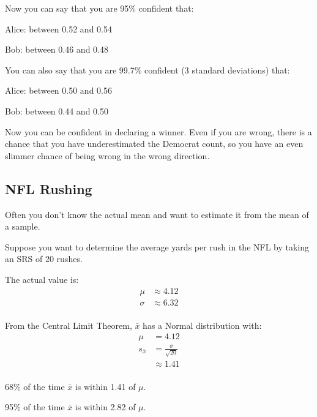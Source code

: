 \documentclass[landscape]{exam}
\begin{document}
  Now you can say that you are 95\% confident that:
  \begin{itemize*}
    \item Alice: between 0.52 and 0.54
    \item Bob: between 0.46 and 0.48
  \end{itemize*}

  You can also say that you are 99.7\% confident (3 standard deviations) that:
  \begin{itemize*}
    \item Alice: between 0.50 and 0.56
    \item Bob: between 0.44 and 0.50
  \end{itemize*}

  Now you can be confident in declaring a winner. Even if you are wrong, there
  is a chance that you have underestimated the Democrat count, so you have an
  even slimmer chance of being wrong in the wrong direction.

  \subsection{NFL Rushing}
  Often you don't know the actual mean and want to estimate it from the mean of
  a sample.

  Suppose you want to determine the average yards per rush in the NFL by taking
  an SRS of 20 rushes.

  The actual value is:
  \begin{align*}
    \mu    & \approx 4.12 \\
    \sigma & \approx 6.32 \\
  \end{align*}

  From the Central Limit Theorem, $\bar{x}$ has a Normal distribution with:
  \begin{align*}
    \mu         & = 4.12 \\
    s_{\bar{x}} & = \frac{\sigma}{\sqrt{20}} \\
                & \approx 1.41 \\
  \end{align*}

  \begin{itemize*}
    \item 68\% of the time $\bar{x}$ is within 1.41 of $\mu$.
    \item 95\% of the time $\bar{x}$ is within 2.82 of $\mu$.
  \end{itemize*}
\end{document}
